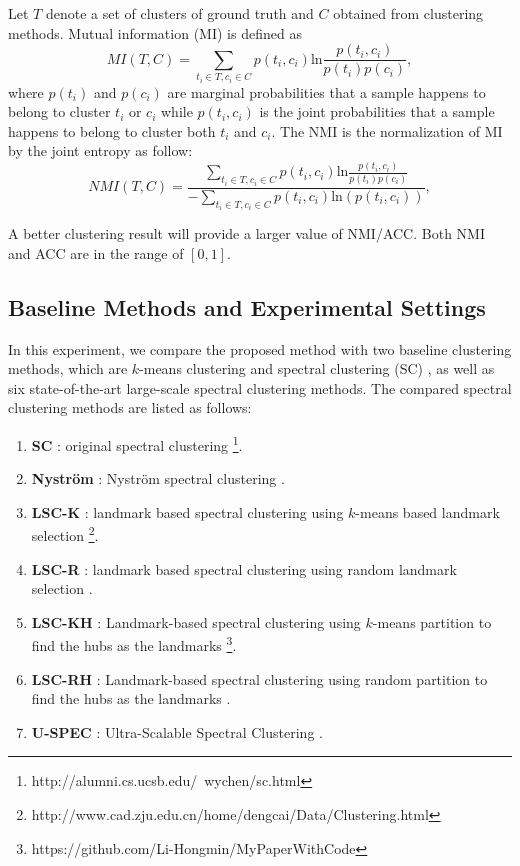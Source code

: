 Let $T$ denote a set of clusters of ground truth and $C$ obtained from clustering methods. Mutual information (MI) is defined as
\begin{equation}
  MI(T,C)=\sum_{t_i\in T,c_i\in C}p(t_i,c_i)\text{ln}\frac{p(t_i,c_i)}{p(t_i)p(c_i)},
\end{equation}
where $p(t_i)$ and $p(c_i)$ are marginal probabilities that a sample happens to belong to cluster $t_i$ or $c_i$ while $p(t_i,c_i)$ is the joint probabilities that a sample happens to belong to cluster both $t_i$ and $c_i$.
The NMI is the normalization of MI by the joint entropy as follow:
\begin{equation}
  \label{NMI}
  NMI(T,C)= \frac{\sum_{t_i\in T,c_i\in C}p(t_i,c_i)\text{ln}\frac{p(t_i,c_i)}{p(t_i)p(c_i)}}
  {-\sum_{t_i\in T,c_i\in C}p(t_i,c_i)\text{ln}(p(t_i,c_i))}
  ,\end{equation}

A better clustering result will provide a larger value of NMI/ACC. Both NMI and ACC are in the range of $[0,1]$.


\subsection{Baseline Methods and Experimental Settings}

In this experiment, we compare the proposed method with two baseline clustering methods, which are $k$-means clustering and spectral clustering (SC) \cite{chen2010parallel}, as well as six state-of-the-art large-scale spectral clustering methods. The compared spectral clustering methods are listed as follows:

\begin{enumerate}
  \item \textbf{SC} \cite{chen2010parallel}: original spectral clustering \footnote{\label{psc}http://alumni.cs.ucsb.edu/~wychen/sc.html}.
  \item \textbf{Nystr\"{o}m} \cite{fowlkes2004spectral}: Nystr\"{o}m spectral clustering .
  \item \textbf{LSC-K} \cite{cai2014large}: landmark based spectral clustering using $k$-means based landmark selection \footnote{\label{LSC}http://www.cad.zju.edu.cn/home/dengcai/Data/Clustering.html}.
  \item \textbf{LSC-R} \cite{cai2014large}: landmark based spectral clustering using random landmark selection .
  \item \textbf{LSC-KH} \cite{ye2018large}: Landmark-based spectral clustering using $k$-means partition to find the hubs as the landmarks \footnote{\label{mycode}https://github.com/Li-Hongmin/MyPaperWithCode}.
  \item \textbf{LSC-RH} \cite{ye2018large}: Landmark-based spectral clustering using random partition to find the hubs as the landmarks .
  \item \textbf{U-SPEC} \cite{huang2019ultra}: Ultra-Scalable Spectral Clustering .
\end{enumerate}


